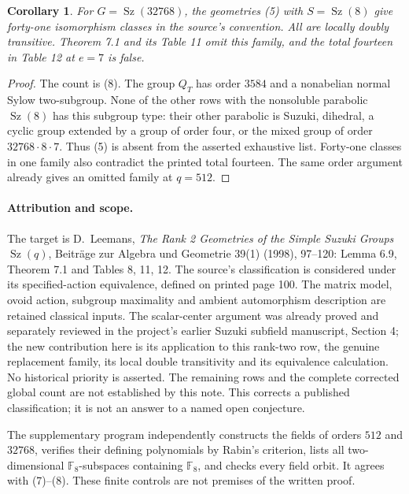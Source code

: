 \documentclass[11pt,a4paper]{article}
\newtheorem{corollary}[theorem]{Corollary}
\newcommand{\F}{\mathbb F}
\newcommand{\Sz}{\operatorname{Sz}}
\begin{document}
\begin{corollary}
For $G=\Sz(32768)$, the geometries (5) with $S=\Sz(8)$ give
forty-one isomorphism classes in the source's convention. All are
locally doubly transitive. Theorem 7.1 and its Table 11 omit this
family, and the total fourteen in Table 12 at $e=7$ is false.
\end{corollary}
\begin{proof}
The count is (8). The group $Q_T$ has order $3584$ and a nonabelian
normal Sylow two-subgroup. None of the other rows with the nonsoluble
parabolic $\Sz(8)$ has this subgroup type: their other parabolic is
Suzuki, dihedral, a cyclic group extended by a group of order four,
or the mixed group of order $32768\cdot8\cdot7$. Thus (5) is absent
from the asserted exhaustive list. Forty-one classes in one family
also contradict the printed total fourteen. The same order argument
already gives an omitted family at $q=512$.
\end{proof}

\paragraph{Attribution and scope.}
The target is D.~Leemans, \emph{The Rank 2 Geometries of the Simple
Suzuki Groups $\Sz(q)$}, Beitr\"age zur Algebra und Geometrie 39(1)
(1998), 97--120: Lemma 6.9, Theorem 7.1 and Tables 8, 11, 12.
The source's classification is considered under its specified-action
equivalence, defined on printed page 100. The matrix model, ovoid
action, subgroup maximality and ambient automorphism description are
retained classical inputs. The scalar-center argument was already
proved and separately reviewed in the project's earlier Suzuki
subfield manuscript, Section 4; the new contribution here is its
application to this rank-two row, the genuine replacement family,
its local double transitivity and its equivalence calculation.
No historical priority is asserted. The remaining rows and the
complete corrected global count are not established by this note.
This corrects a published classification; it is not an answer to a
named open conjecture.

The supplementary program independently constructs the fields of
orders $512$ and $32768$, verifies their defining polynomials by
Rabin's criterion, lists all two-dimensional $\F_8$-subspaces
containing $\F_8$, and checks every field orbit. It agrees with
(7)--(8). These finite controls are not premises of the written proof.
\end{document}
